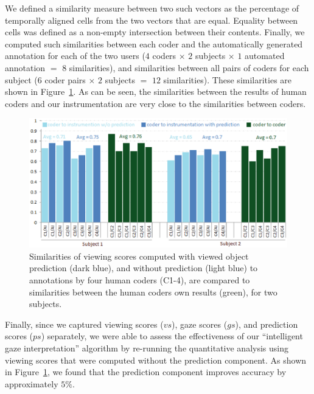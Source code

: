 We defined a similarity measure between two such vectors as the percentage of temporally aligned cells from the two vectors that are equal. Equality between cells was defined as a non-empty intersection between their contents. Finally, we computed such similarities between each coder and the automatically generated annotation for each of the two users ($4$ coders $\times$ $2$ subjects $\times$ $1$ automated annotation $=$ $8$ similarities), and similarities between all pairs of coders for each subject ($6$ coder pairs $\times$ $2$ subjects $=$ $12$ similarities). These similarities are shown in Figure~\ref{fig:quantitative}. As can be seen, the similarities between the results of human coders and our instrumentation are very close to the similarities between coders. 

\begin{figure}[htb]
  \centering
  \includegraphics[width=\linewidth]{images/quantitative.eps}
  \caption{Similarities of viewing scores computed with viewed object prediction (dark blue), and without prediction (light blue) to annotations by four human coders (C1-4), are compared to similarities between the human coders own results (green), for two subjects. }
	\label{fig:quantitative}
\end{figure}

Finally, since we captured viewing scores ($vs$), gaze scores ($gs$), and prediction scores ($ps$) separately, we were able to assess the effectiveness of our ``intelligent gaze interpretation'' algorithm by re-running the quantitative analysis using viewing scores that were computed without the prediction component. As shown in Figure~\ref{fig:quantitative}, we found that the prediction component improves accuracy by approximately $5\%$. 